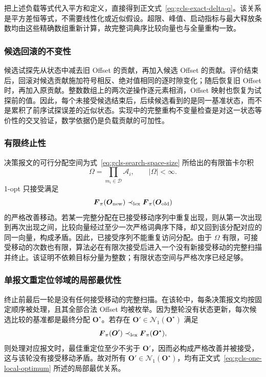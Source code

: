 \documentclass[UTF8,a4paper,twoside,zihao=-4]{ctexart}
\numberwithin{equation}{section}
\numberwithin{figure}{section}
\numberwithin{table}{section}
\theoremstyle{definition}
\newcommand{\Oset}{\mathcal{A}}
\numberwithin{algocf}{section}
\begin{document}
把上述负载等式代入平方和定义，直接得到正文式~\eqref{eq:gcls-exact-delta-q}。该关系是平方差恒等式，不需要线性化或近似假设。超限、峰值、启动指标与最大释放条数均由这些精确数组重新计算，故完整词典序比较向量也与全量重构一致。

\subsubsection{候选回滚的不变性}
\label{subsubsec:appendix-rollback-proof}

候选试探先从状态中减去旧 Offset 的贡献，再加入候选 Offset 的贡献。评价结束后，回滚对候选贡献施加符号相反、绝对值相同的逐时隙变化；随后恢复旧 Offset 时，再加入原贡献。整数数组上的两次逆操作逐元素相消，Offset 映射也恢复为试探前的值。因此，每个未接受候选结束后，后续候选看到的是同一基准状态，而不是累积了前序试探误差的近似状态。实现中的完整重构不变量检查是对这一状态等价性的交叉验证，数学依据仍是负载贡献的可加性。

\subsubsection{有限终止性}
\label{subsubsec:appendix-one-termination}

决策报文的可行分配空间为式~\eqref{eq:gcls-search-space-size} 所给出的有限笛卡尔积
\[
 \Omega
 =
 \prod_{m_i\in\mathcal D}\Oset_i,
 \qquad |\Omega|<\infty.
\]
1-opt 只接受满足
\[
 \boldsymbol F_\pi(\boldsymbol O_{\rm new})
 \prec_{\rm lex}
 \boldsymbol F_\pi(\boldsymbol O_{\rm old})
\]
的严格改善移动。若某一完整分配在已接受移动序列中重复出现，则从第一次出现到再次出现之间，比较向量经过至少一次严格词典序下降，却又回到该分配对应的同一向量，构成矛盾。因此，已接受序列不能重复访问分配。由于 $\Omega$ 有限，可接受移动的次数也有限，算法必在有限次接受后进入一个没有新接受移动的完整扫描并终止。该证明不依赖目标分量为整数；有限状态空间与严格次序已经足够。

\subsubsection{单报文重定位邻域的局部最优性}
\label{subsubsec:appendix-one-local}

终止前最后一轮是没有任何接受移动的完整扫描。在该轮中，每条决策报文均按固定顺序被处理，且其全部合法 Offset 均被枚举。因为整轮没有状态更新，每次候选比较的基准都是最终分配
$\boldsymbol O^\star$。若存在
$\boldsymbol O'\in\mathcal N_1(\boldsymbol O^\star)$ 满足
\[
 \boldsymbol F_\pi(\boldsymbol O')
 \prec_{\rm lex}
 \boldsymbol F_\pi(\boldsymbol O^\star),
\]
则处理对应报文时，最佳重定位至少不劣于 $\boldsymbol O'$，因而必构成严格改善并被接受，这与该轮没有接受移动矛盾。故对所有
$\boldsymbol O'\in\mathcal N_1(\boldsymbol O^\star)$，均有正文式~\eqref{eq:gcls-one-local-optimum} 所述的局部最优关系。
\end{document}
